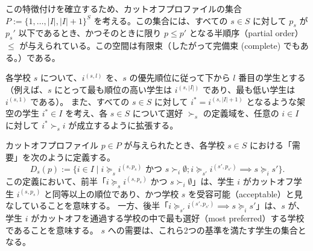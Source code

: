 \documentclass[12pt, a4paper]{article}
\theoremstyle{definition}
\theoremstyle{remark}
\theoremstyle{plain}
\begin{document}
この特徴付けを確立するため、カットオフプロファイルの集合 \( P := \{ 1, \ldots, | I |, | I | + 1 \} ^S \) を考える。この集合には、すべての \( s \in S \) に対して \( p_s \) が \( p_s' \) 以下であるとき、かつそのときに限り \( p \leq p' \) となる半順序（partial order）\( \leq \) が与えられている。この空間は有限束（したがって完備束 (complete) でもある。）である。

各学校 \( s \) について、\( i^{(s,l)} \) を、\( s \) の優先順位に従って下から \( l \) 番目の学生とする（例えば、\( s \) にとって最も順位の高い学生は \( i^{(s,|I|)} \) であり、最も低い学生は \( i^{(s,1)} \) である）。
また、すべての \( s \in S \) に対して \( i^* = i^{(s,|I|+1)} \) となるような架空の学生 \( i^* \in I \) を考え、各 \( s \in S \) について選好 \( \succ_s \) の定義域を、任意の \( i \in I \) に対して \( i^* \succ_s i \) が成立するように拡張する。

カットオフプロファイル \( p \in P \) が与えられたとき、各学校 \( s \in S \) における「需要」を次のように定義する。
\[
  D_s(p) := \{i \in I \mid i \succeq_s i^{(s,p_s)} \text{ かつ } s \succ_i \emptyset; i \succeq_{s'} i^{(s',p_{s'})} \implies s \succeq_i s' \}.
\]
この定義において、前半「\( i \succeq_s i^{(s,p_s)} \) かつ \( s \succ_i \emptyset \)」は、学生 \( i \) がカットオフ学生 \( i^{(s,p_s)} \) と同等以上の順位であり、かつ学校 \( s \) を受容可能（acceptable）と見なしていることを意味する。
一方、後半「\( i \succeq_{s'} i^{(s',p_{s'})} \implies s \succeq_i s' \)」は、\( s \) が、学生 \( i \) がカットオフを通過する学校の中で最も選好（most preferred）する学校であることを意味する。
\( s \) への需要は、これら2つの基準を満たす学生の集合となる。
\end{document}
